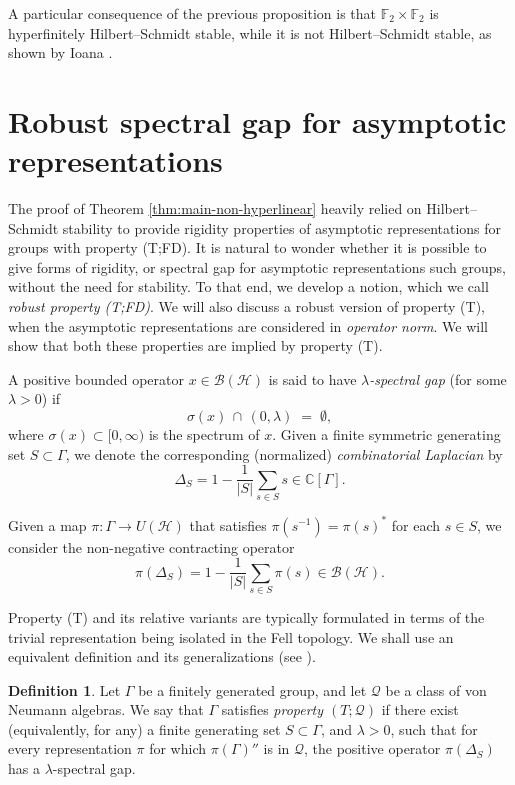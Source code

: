 \documentclass[11pt]{amsart}
\newcommand{\C}{{\mathbb{C}}}
\newcommand{\cH}{{\mathcal{H}}}
\theoremstyle{definition}
\newtheorem{definition}[theorem]{Definition}
\theoremstyle{remark}
\theoremstyle{definition}
\begin{document}
A particular consequence of the previous proposition is that $\mathbb F_2 \times \mathbb F_2$ is hyperfinitely Hilbert--Schmidt stable, while it is not Hilbert--Schmidt stable, as shown by Ioana \cite{ioana2024almost}.


\section{Robust spectral gap for asymptotic representations}\label{sec:rob}

The proof of Theorem \ref{thm:main-non-hyperlinear} heavily relied on Hilbert--Schmidt stability to provide rigidity properties of asymptotic representations for groups with property (T;FD). 
It is natural to wonder whether it is possible to give forms of rigidity, or spectral gap for asymptotic representations such groups, without the need for stability.
To that end, we develop a notion, which we call \emph{robust property (T;FD)}. 
We will also discuss a robust version of property (T), when the asymptotic representations are considered in \emph{operator norm}.
We will show that both these properties are implied by property (T).



A positive bounded operator \(x \in \mathcal{B}(\mathcal{H})\) is said to have \emph{\(\lambda\)-spectral gap} (for some \(\lambda > 0\)) if
\[
\sigma(x)\,\cap\,(0,\lambda) \;=\; \emptyset,
\]
where $\sigma(x)\subset [0,\infty)$ is the spectrum of $x$.
Given a finite symmetric generating set $S\subset \Gamma$, we denote the corresponding (normalized) \emph{combinatorial Laplacian} by \[\Delta_S = 1 - \frac{1}{|S|}\sum_{s \in S} s \in \C[\Gamma].\]

Given a map  $\pi:\Gamma \to U(\cH)$ that satisfies $\pi(s^{-1}) = \pi(s)^*$ for each $s \in S$, we consider the non-negative  contracting operator  \[\pi(\Delta_S) = 1 - \frac{1}{|S|}\sum_{s\in S} \pi(s)\in \mathcal{B}(\mathcal{H}).\]


Property (T) and its relative variants are typically formulated in terms of the trivial representation being isolated in the Fell topology. We shall use an equivalent definition and its generalizations (see \cite{LZimm}).

\begin{definition}
    Let \(\Gamma\) be a finitely generated group, and let \(\mathcal{Q}\) be a class of von Neumann algebras.
    We say that \(\Gamma\) satisfies \emph{property \((T;\mathcal{Q})\)} if there exist (equivalently, for any) a finite generating set \(S \subset \Gamma\),  and \(\lambda > 0\), such that for every representation $\pi$ for which $\pi(\Gamma)''$ is in $\mathcal Q$, the positive operator \(\pi(\Delta_S)\) has a \(\lambda\)-spectral gap.
\end{definition} 
\end{document}
